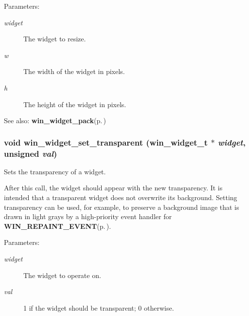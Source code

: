 \begin{Desc}
\item[Parameters:]
\begin{description}
\item[{\em widget}]The widget to resize. \item[{\em w}]The width of the widget in pixels. \item[{\em h}]The height of the widget in pixels.\end{description}
\end{Desc}
\begin{Desc}
\item[See also:]{\bf win\_\-widget\_\-pack}{\rm (p.\,\pageref{winwidget_8h_a12})} \end{Desc}
\subsubsection{\setlength{\rightskip}{0pt plus 5cm}void win\_\-widget\_\-set\_\-transparent ({\bf win\_\-widget\_\-t} $\ast$ {\em widget}, unsigned {\em val})}\label{winwidget_8h_a17}


Sets the transparency of a widget. 

After this call, the widget should appear with the new transparency. It is intended that a transparent widget does not overwrite its background. Setting transparency can be used, for example, to preserve a background image that is drawn in light grays by a high-priority event handler for {\bf WIN\_\-REPAINT\_\-EVENT}{\rm (p.\,\pageref{winwidget_8h_a0})}.

\begin{Desc}
\item[Parameters:]
\begin{description}
\item[{\em widget}]The widget to operate on. \item[{\em val}]1 if the widget should be transparent; 0 otherwise. \end{description}
\end{Desc}
